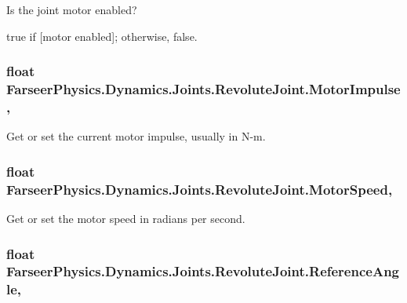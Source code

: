 Is the joint motor enabled? 

{\ttfamily true} if \mbox{[}motor enabled\mbox{]}; otherwise, {\ttfamily false}.\hypertarget{class_farseer_physics_1_1_dynamics_1_1_joints_1_1_revolute_joint_aa7a108f318d3a42bfb1095276f15a082}{
\subsubsection[{Motor\+Impulse}]{\setlength{\rightskip}{0pt plus 5cm}float Farseer\+Physics.\+Dynamics.\+Joints.\+Revolute\+Joint.\+Motor\+Impulse\hspace{0.3cm}{\ttfamily [get]}, {\ttfamily [set]}}}\label{class_farseer_physics_1_1_dynamics_1_1_joints_1_1_revolute_joint_aa7a108f318d3a42bfb1095276f15a082}


Get or set the current motor impulse, usually in N-\/m. 

\hypertarget{class_farseer_physics_1_1_dynamics_1_1_joints_1_1_revolute_joint_aaccf23cc3f7d91fbb41ae72cb2471566}{
\subsubsection[{Motor\+Speed}]{\setlength{\rightskip}{0pt plus 5cm}float Farseer\+Physics.\+Dynamics.\+Joints.\+Revolute\+Joint.\+Motor\+Speed\hspace{0.3cm}{\ttfamily [get]}, {\ttfamily [set]}}}\label{class_farseer_physics_1_1_dynamics_1_1_joints_1_1_revolute_joint_aaccf23cc3f7d91fbb41ae72cb2471566}


Get or set the motor speed in radians per second. 

\hypertarget{class_farseer_physics_1_1_dynamics_1_1_joints_1_1_revolute_joint_af3ec8195281b5fa8b9afa2b8017826e6}{
\subsubsection[{Reference\+Angle}]{\setlength{\rightskip}{0pt plus 5cm}float Farseer\+Physics.\+Dynamics.\+Joints.\+Revolute\+Joint.\+Reference\+Angle\hspace{0.3cm}{\ttfamily [get]}, {\ttfamily [set]}}}\label{class_farseer_physics_1_1_dynamics_1_1_joints_1_1_revolute_joint_af3ec8195281b5fa8b9afa2b8017826e6}


